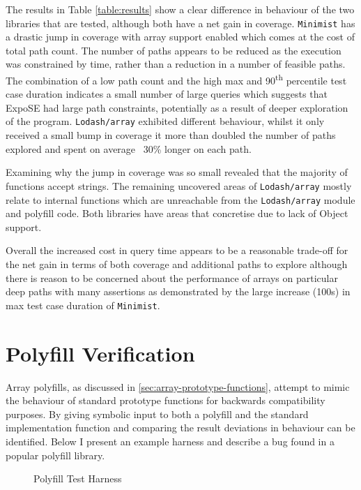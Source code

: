 \documentclass[]{final_report}
\begin{document}
The results in Table \ref{table:results} show a clear difference in behaviour of the two libraries that are tested, although both have a net gain in coverage. \lstinline|Minimist| has a drastic jump in coverage with array support enabled which comes at the cost of total path count. The number of paths appears to be reduced as the execution was constrained by time, rather than a reduction in a number of feasible paths. The combination of a low path count and the high max and 90\textsuperscript{th} percentile test case duration indicates a small number of large queries which suggests that ExpoSE had large path constraints, potentially as a result of deeper exploration of the program. \lstinline|Lodash/array| exhibited different behaviour, whilst it only received a small bump in coverage it more than doubled the number of paths explored and spent on average ~30\% longer on each path. 


Examining why the jump in coverage was so small revealed that the majority of functions accept strings. The remaining uncovered areas of \lstinline|Lodash/array| mostly relate to internal functions which are unreachable from the \lstinline|Lodash/array| module and polyfill code. Both libraries have areas that concretise due to lack of Object support.



Overall the increased cost in query time appears to be a reasonable trade-off for the net gain in terms of both coverage and additional paths to explore although there is reason to be concerned about the performance of arrays on particular deep paths with many assertions as demonstrated by the large increase (100s) in max test case duration of \lstinline|Minimist|.

\section{Polyfill Verification}
Array polyfills, as discussed in \ref{sec:array-prototype-functions}, attempt to mimic the behaviour of standard prototype functions for backwards compatibility purposes. By giving symbolic input to both a polyfill and the standard implementation function and comparing the result deviations in behaviour can be identified. Below I present an example harness and describe a bug found in a popular polyfill library.

\begin{figure}[t]

\caption{\label{fig:polyfill-test-harness} Polyfill Test Harness}
\end{figure}
\end{document}
